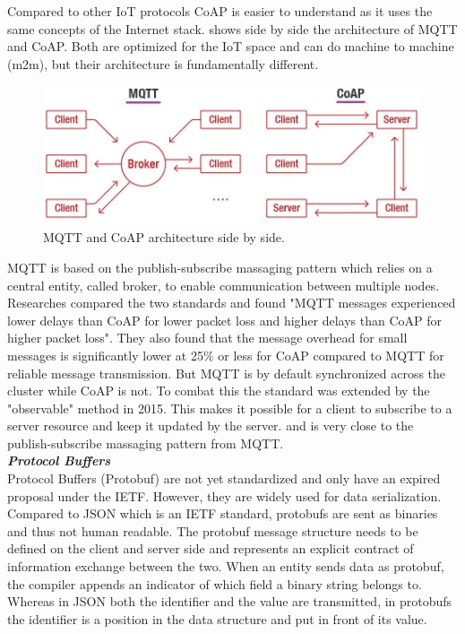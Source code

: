 Compared to other IoT protocols CoAP is easier to understand as it uses the same concepts of the Internet stack.  shows side by side the architecture of MQTT and CoAP. Both are optimized for the IoT space and can do machine to machine (m2m), but their architecture is fundamentally different.
\begin{figure}[h!]
    \centering
    \includegraphics[scale=0.45]{figures/mqtt-vs-coap.jpg}
    \caption{MQTT and CoAP architecture side by side\cite{COAPvsMQTT27:online}.}
    \label{fig:mqttVsCoap}
\end{figure}
MQTT is based on the publish-subscribe massaging pattern which relies on a central entity, called broker, to enable communication between multiple nodes. Researches compared the two standards and found "MQTT messages experienced lower delays than CoAP for lower packet loss and higher delays than CoAP for higher packet loss"\cite{MQTTvsCoAPAnalysisIEEE}. They also found that the message overhead for small messages is significantly lower at 25\% or less for CoAP compared to MQTT for reliable message transmission. But MQTT is by default synchronized across the cluster while CoAP is not. To combat this the standard was extended by the "observable" method in 2015\cite{RFC7641observableCoAP}. This makes it possible for a client to subscribe to a server resource and keep it updated by the server. and is very close to the publish-subscribe massaging pattern from MQTT.\\[5mm]
{\textbf{\textit{Protocol Buffers}}}\\
Protocol Buffers (Protobuf) are not yet standardized and only have an expired proposal under the IETF\cite{rfernando-protocol-buffers-00}. However, they are widely used for data serialization. Compared to JSON which is an IETF standard, protobufs are sent as binaries and thus not human readable. The protobuf message structure needs to be defined on the client and server side and represents an explicit contract of information exchange between the two. When an entity sends data as protobuf, the compiler appends an indicator of which field a binary string belongs to. Whereas in JSON both the identifier and the value are transmitted, in protobufs the identifier is a position in the data structure and put in front of its value.
